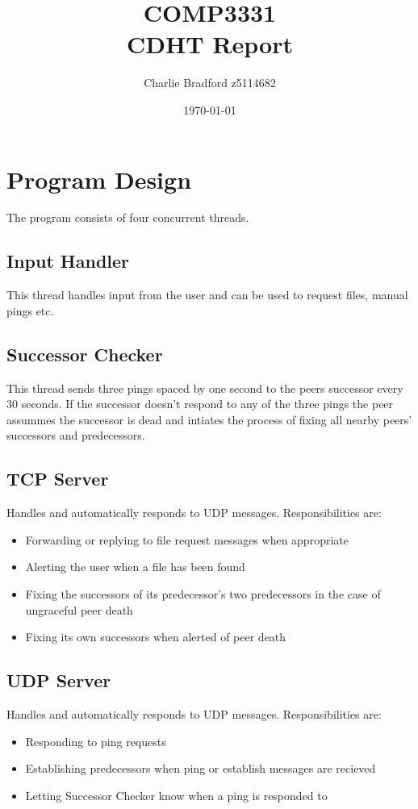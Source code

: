 \documentclass[a4paper]{article}
\title{%
		COMP3331 \\
\large CDHT Report}
\author{Charlie Bradford z5114682}
\date{\today}
\begin{document}
\vspace{-2cm}
\maketitle

\section{Program Design}

The program consists of four concurrent threads.

\subsection{Input Handler}
This thread handles input from the user and can be used to request files, manual pings etc.

\subsection{Successor Checker}
This thread sends three pings spaced by one second to the peers successor every 30 seconds. If the successor doesn't respond to any of the three pings the peer assummes the successor is dead and intiates the process of fixing all nearby peers' successors and predecessors.

\subsection{TCP Server}
Handles and automatically responds to UDP messages. Responsibilities are:
\begin{itemize}
		\item Forwarding or replying to file request messages when appropriate
		\item Alerting the user when a file has been found
		\item Fixing the successors of its predecessor's two predecessors in the case of ungraceful peer death
		\item Fixing its own successors when alerted of peer death
\end{itemize}

\subsection{UDP Server}
Handles and automatically responds to UDP messages. Responsibilities are:
\begin{itemize}
		\item Responding to ping requests
		\item Establishing predecessors when ping or establish messages are recieved
		\item Letting Successor Checker know when a ping is responded to
\end{itemize}
\end{document}
